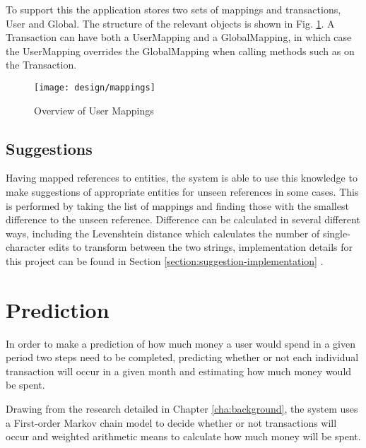 To support this the application stores two sets of mappings and transactions, User and Global. The structure of the relevant objects is shown in Fig. \ref{fig:transactormappings}. A Transaction can have both a UserMapping and a GlobalMapping, in which case the UserMapping overrides the GlobalMapping when calling methods such as  on the Transaction.

\begin{figure}[h]
    \centering
    \texttt{[image: design/mappings]}
    \caption{Overview of User Mappings}
    \label{fig:transactormappings}
    
    \begin{comment}
[Transaction]<>*-0..1[UserMapping]
[Transaction]<>*-0..1-[GlobalMapping]
[User]<>-*[UserMapping]
[UserMapping]<>*-[UserTransactor]
[UserTransactor]<>*-[Category]
[GlobalTransactor]<>*-[Category]
[GlobalMapping]<>*-[GlobalTransactor]
    \end{comment}
\end{figure}

\subsection{Suggestions}
Having mapped \glspl{reference} to entities, the system is able to use this knowledge to make suggestions of appropriate entities for unseen references in some cases.
%
This is performed by taking the list of mappings and finding those with the smallest difference to the unseen reference. Difference can be calculated in several different ways, including the Levenshtein distance which calculates the number of single-character edits to transform between the two strings, implementation details for this project can be found in Section \ref{section:suggestion-implementation} \cite{levenshtein1966binary}.

\section{Prediction}
In order to make a prediction of how much money a user would spend in a given period two steps need to be completed, predicting whether or not each individual transaction will occur in a given month and estimating how much money would be spent.

Drawing from the research detailed in Chapter \ref{cha:background}, the system uses a First-order Markov chain model to decide whether or not transactions will occur and weighted arithmetic means to calculate how much money will be spent.

